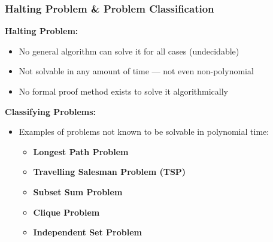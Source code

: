 \documentclass[10pt,aspectratio=43]{beamer}
\begin{document}
\begin{frame}
  \frametitle{Halting Problem \& Problem Classification}
  
  \textbf{Halting Problem:}
  \begin{itemize}
      \item No general algorithm can solve it for all cases (undecidable)
      \vspace{3pt}
      \item Not solvable in any amount of time — not even non-polynomial
      \vspace{3pt}
      \item No formal proof method exists to solve it algorithmically
  \end{itemize}
  
  \vspace{0.5cm}
  
  \textbf{Classifying Problems:}
  \begin{itemize}
      \vspace{5pt}
      \item Examples of problems not known to be solvable in polynomial time:
      \begin{itemize}
          \item \textbf{Longest Path Problem}
          \vspace{3pt}
          \item \textbf{Travelling Salesman Problem (TSP)}
          \vspace{3pt}
          \item \textbf{Subset Sum Problem}
          \vspace{3pt}
          \item \textbf{Clique Problem}
          \vspace{3pt}
          \item \textbf{Independent Set Problem}
      \end{itemize}
  \end{itemize}
\end{frame}
\end{document}
